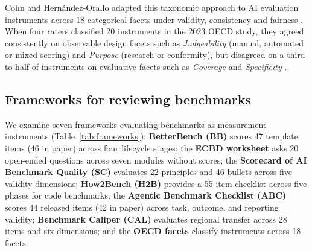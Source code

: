 \documentclass[10pt,conference]{IEEEtran}
\begin{document}
Cohn and Hern\'andez-Orallo adapted this taxonomic approach to AI evaluation instruments across 18 categorical facets under validity, consistency and fairness \cite{cohn_categorising_2022,cohn_hernandez_orallo_oecd_2023}. When four raters classified 20 instruments in the 2023 OECD study, they agreed consistently on observable design facets such as \emph{Judgeability} (manual, automated or mixed scoring) and \emph{Purpose} (research or conformity), but disagreed on a third to half of instruments on evaluative facets such as \emph{Coverage} and \emph{Specificity} \cite{cohn_hernandez_orallo_oecd_2023}.

\subsection{Frameworks for reviewing benchmarks}
We examine seven frameworks evaluating benchmarks as measurement instruments (Table~\ref{tab:frameworks}): \textbf{BetterBench (BB)} \cite{reuel_betterbench} scores 47 template items (46 in paper) across four lifecycle stages; the \textbf{ECBD worksheet} \cite{liu_ecbd_2024} asks 20 open-ended questions across seven modules without scores; the \textbf{Scorecard of AI Benchmark Quality (SC)} \cite{san_joaquin_scorecard_2026} evaluates 22 principles and 46 bullets across five validity dimensions; \textbf{How2Bench (H2B)} \cite{cao_how2bench_2025} provides a 55-item checklist across five phases for code benchmarks; the \textbf{Agentic Benchmark Checklist (ABC)} \cite{zhu_agentic_benchmark_checklist_2025} scores 44 released items (42 in paper) across task, outcome, and reporting validity; \textbf{Benchmark Caliper (CAL)} \cite{corona_benchmark_caliper_2026} evaluates regional transfer across 28 items and six dimensions; and the \textbf{OECD facets} \cite{cohn_hernandez_orallo_oecd_2023} classify instruments across 18 facets.
\end{document}
